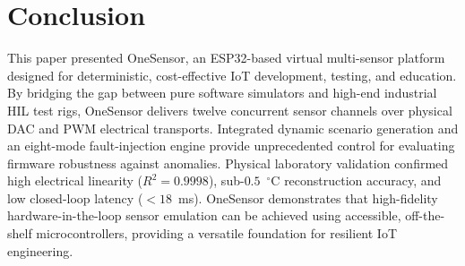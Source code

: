 \documentclass[conference]{IEEEtran}
\begin{document}
\section{Conclusion}
This paper presented OneSensor, an ESP32-based virtual multi-sensor platform designed for deterministic, cost-effective IoT development, testing, and education. By bridging the gap between pure software simulators and high-end industrial HIL test rigs, OneSensor delivers twelve concurrent sensor channels over physical DAC and PWM electrical transports. Integrated dynamic scenario generation and an eight-mode fault-injection engine provide unprecedented control for evaluating firmware robustness against anomalies. Physical laboratory validation confirmed high electrical linearity ($R^2 = 0.9998$), sub-$0.5$~$^\circ$C reconstruction accuracy, and low closed-loop latency ($< 18$~ms). OneSensor demonstrates that high-fidelity hardware-in-the-loop sensor emulation can be achieved using accessible, off-the-shelf microcontrollers, providing a versatile foundation for resilient IoT engineering.



\end{document}
